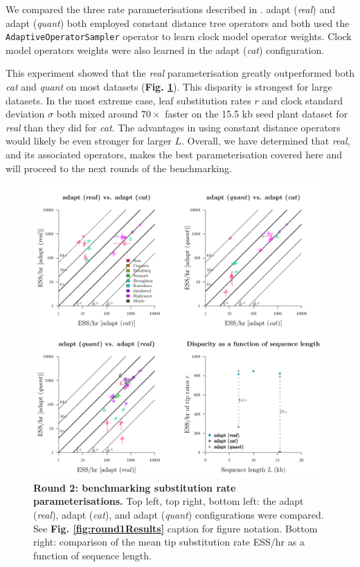 \documentclass[10pt,letterpaper]{article}
\begin{document}
We compared the three rate parameterisations described in \textbf{}. 
adapt (\textit{real}) and adapt (\textit{quant}) both employed constant distance tree operators \cite{zhang2020improving} and both used the \texttt{AdaptiveOperatorSampler} operator to learn clock model operator weights.
Clock model operators weights were also learned in the adapt (\textit{cat}) configuration.




This experiment showed that the \textit{real} parameterisation greatly outperformed both \textit{cat} and \textit{quant} on most datasets (\textbf{Fig. \ref{fig:round2Results}}).
This disparity is strongest for large datasets.
In the most extreme case, leaf substitution rates $r$ and clock standard deviation $\sigma$ both mixed around $70 \times$ faster on the 15.5 kb seed plant dataset \cite{Ran_2018} for \textit{real} than they did for \textit{cat}.
The advantages in using constant distance operators would likely be even stronger for larger $L$.
Overall, we have determined that \textit{real}, and its associated operators, makes the best parameterisation covered here and will proceed to the next rounds of the benchmarking.



\begin{figure}[!h]
\includegraphics[width=\textwidth]{benchmarking/benchmarkingVM/ESS_round2.pdf}
\caption{\textbf{Round 2: benchmarking substitution rate parameterisations.} Top left, top right, bottom left: the adapt (\textit{real}), adapt (\textit{cat}), and adapt (\textit{quant}) configurations were compared. See \textbf{Fig. \ref{fig:round1Results}} caption for figure notation. Bottom right: comparison of the mean tip substitution rate ESS/hr as a function of sequence length. }
\label{fig:round2Results}
\end{figure}
\end{document}
